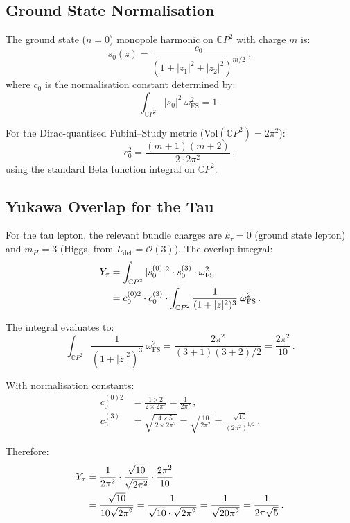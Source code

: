 \documentclass[11pt,a4paper]{article}
\newcommand{\CP}{\mathbb{C}P}
\begin{document}
\subsection{Ground State Normalisation}

The ground state ($n=0$) monopole harmonic on $\CP^2$ with charge $m$ is:
\begin{equation}
s_0(z) = \frac{c_0}{(1 + |z_1|^2 + |z_2|^2)^{m/2}}\,,
\end{equation}
where $c_0$ is the normalisation constant determined by:
\begin{equation}
\int_{\CP^2} |s_0|^2\;\omega_{\mathrm{FS}}^2 = 1\,.
\end{equation}

For the Dirac-quantised Fubini--Study metric (Vol$(\CP^2) = 2\pi^2$):
\begin{equation}
c_0^2 = \frac{(m+1)(m+2)}{2 \cdot 2\pi^2}\,,
\end{equation}
using the standard Beta function integral on $\CP^2$.

\subsection{Yukawa Overlap for the Tau}

For the tau lepton, the relevant bundle charges are $k_\tau = 0$ (ground state lepton) and $m_H = 3$ (Higgs, from $L_{\det} = \mathcal{O}(3)$). The overlap integral:
\begin{align}
Y_\tau &= \int_{\CP^2} |s_0^{(0)}|^2 \cdot s_0^{(3)} \cdot \omega_{\mathrm{FS}}^2 \notag\\
&= c_0^{(0)2} \cdot c_0^{(3)} \cdot \int_{\CP^2} \frac{1}{(1+|z|^2)^3}\;\omega_{\mathrm{FS}}^2\,.
\end{align}

The integral evaluates to:
\begin{equation}
\int_{\CP^2} \frac{1}{(1+|z|^2)^3}\;\omega_{\mathrm{FS}}^2 = \frac{2\pi^2}{(3+1)(3+2)/2} = \frac{2\pi^2}{10}\,.
\end{equation}

With normalisation constants:
\begin{align}
c_0^{(0)2} &= \frac{1 \times 2}{2 \times 2\pi^2} = \frac{1}{2\pi^2}\,, \\
c_0^{(3)} &= \sqrt{\frac{4 \times 5}{2 \times 2\pi^2}} = \sqrt{\frac{10}{2\pi^2}} = \frac{\sqrt{10}}{(2\pi^2)^{1/2}}\,.
\end{align}

Therefore:
\begin{align}
Y_\tau &= \frac{1}{2\pi^2} \cdot \frac{\sqrt{10}}{\sqrt{2\pi^2}} \cdot \frac{2\pi^2}{10} \notag\\
&= \frac{\sqrt{10}}{10\sqrt{2\pi^2}} = \frac{1}{\sqrt{10} \cdot \sqrt{2\pi^2}} = \frac{1}{\sqrt{20\pi^2}} = \frac{1}{2\pi\sqrt{5}}\,.
\end{align}
\end{document}

